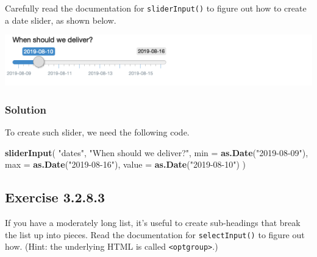 \documentclass[]{book}
\newenvironment{Shaded}{\begin{snugshade}}{\end{snugshade}}
\newcommand{\DataTypeTok}[1]{\textcolor[rgb]{0.13,0.29,0.53}{#1}}
\newcommand{\KeywordTok}[1]{\textcolor[rgb]{0.13,0.29,0.53}{\textbf{#1}}}
\newcommand{\NormalTok}[1]{#1}
\newcommand{\StringTok}[1]{\textcolor[rgb]{0.31,0.60,0.02}{#1}}
\begin{document}
Carefully read the documentation for \texttt{sliderInput()} to figure out how to
create a date slider, as shown below.

\includegraphics{images/date-slider.png}

\begin{solution}

\hypertarget{solution-1}{%
\subsubsection*{Solution}\label{solution-1}}

To create such slider, we need the following code.

\begin{Shaded}
\begin{Highlighting}[]
\KeywordTok{sliderInput}\NormalTok{(}
  \StringTok{"dates"}\NormalTok{,}
  \StringTok{"When should we deliver?"}\NormalTok{,}
  \DataTypeTok{min =} \KeywordTok{as.Date}\NormalTok{(}\StringTok{"2019-08-09"}\NormalTok{),}
  \DataTypeTok{max =} \KeywordTok{as.Date}\NormalTok{(}\StringTok{"2019-08-16"}\NormalTok{),}
  \DataTypeTok{value =} \KeywordTok{as.Date}\NormalTok{(}\StringTok{"2019-08-10"}\NormalTok{)}
\NormalTok{)}
\end{Highlighting}
\end{Shaded}

\end{solution}

\hypertarget{exercise-3.2.8.3}{%
\subsection*{Exercise 3.2.8.3}\label{exercise-3.2.8.3}}

If you have a moderately long list, it's useful to create sub-headings that
break the list up into pieces. Read the documentation for \texttt{selectInput()} to
figure out how. (Hint: the underlying HTML is called \texttt{\textless{}optgroup\textgreater{}}.)
\end{document}
